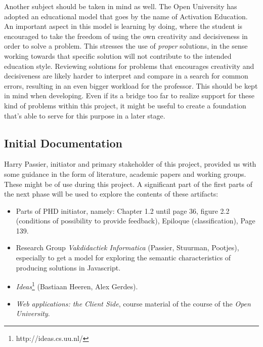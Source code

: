 \documentclass{article}
\begin{document}
Another subject should be taken in mind as well. The Open University has
adopted an educational model that goes by the name of Activation Education. An
important aspect in this model is learning by doing, where the student is
encouraged to take the freedom of using the own creativity and decisiveness in
order to solve a problem. This stresses the use of {\em proper} solutions, in
the sense working towards that specific solution will not contribute to the
intended education style. Reviewing solutions for problems that encourages
creativity and decisiveness are likely harder to interpret and compare in a
search for common errors, resulting in an even bigger workload for the
professor. This should be kept in mind when developing. Even if its a bridge
too far to realize support for these kind of problems within this project, it
might be useful to create a foundation that's able to serve for this purpose in
a later stage.

\subsection{Initial Documentation}

Harry Passier, initiator and primary stakeholder of this project, provided us
with some guidance in the form of literature, academic papers and working
groups. These might be of use during this project. A significant part of the
first parts of the next phase will be used to explore the contents of these
artifacts:
\begin{itemize}
  \item Parts of PHD initiator, namely: Chapter 1.2 until page 36, figure
    2.2 (conditions of possibility to provide feedback), Epiloque
    (classification), Page 139.
  \item Research Group {\em Vakdidactiek Informatica} (Passier, Stuurman,
    Pootjes), especially to get a model for exploring the semantic
    characteristics of producing solutions in Javascript.
  \item {\em Ideas}\footnote{http://ideas.cs.uu.nl/} (Bastiaan Heeren, Alex
    Gerdes).
  \item {\em Web applications: the Client Side}, course material of the course
    of the {\em Open University}.
\end{itemize}
\end{document}
